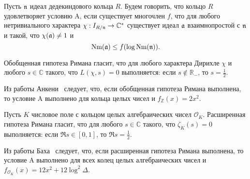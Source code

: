 \documentclass[_00_dissertation.tex]{subfiles}
\begin{document}
\begin{definition}
    Пусть $\mathfrak{n}$ идеал дедекиндового кольца $R$.
    Будем говорить, что кольцо $R$ удовлетворяет условию A, если существует многочлен $f$, что для любого нетривиального характера $\chi: I_{R/\mathfrak{n}} \to \mathbb{C}^{*}$ существует идеал $\mathfrak{a}$ взаимнопростой с $\mathfrak{n}$ и такой, что $\chi(\mathfrak{a}) \neq 1$ и
    \begin{equation*}
        \textrm{Nm}(\mathfrak{a}) \le f(\log{\textrm{Nm}(\mathfrak{n})}).
    \end{equation*}
\end{definition}

\begin{remark}
    Обобщенная гипотеза Римана гласит, что для любого характера Дирихле $\chi$ и любого $s \in \mathbb{C}$ такого, что $L(\chi, s) = 0$ выполняется: если $s \not\in \mathbb{R}_{-}$, то $s = \frac{1}{2}$.

    Из работы Анкени~\cite{source:Ankeny} следует, что, если обобщенная гипотеза Римана выполнена, то условие A выполнено для кольца целых чисел и $f_{\mathbb{Z}}(x) = 2x^2$.
\end{remark}

\begin{remark}
    Пусть $K$ числовое поле с кольцом целых алгебраических чисел $\mathcal{O}_K$.
    Расширенная гипотеза Римана гласит, что для любого $s \in \mathbb{C}$ такого, что $\zeta_K(s) = 0$ выполняется: если $\Re{s} \in [0, 1]$, то $\Re{s} = \frac{1}{2}$.

    Из работы Баха~\cite{source:Bach} следует, что, если расширенная гипотеза Римана выполнена, то условие A выполнено для всех колец целых алгебраических чисел и $f_{\mathcal{O}_K}(x) = 12x^2 + 12\log^2 \Delta$.
\end{remark}
\end{document}
